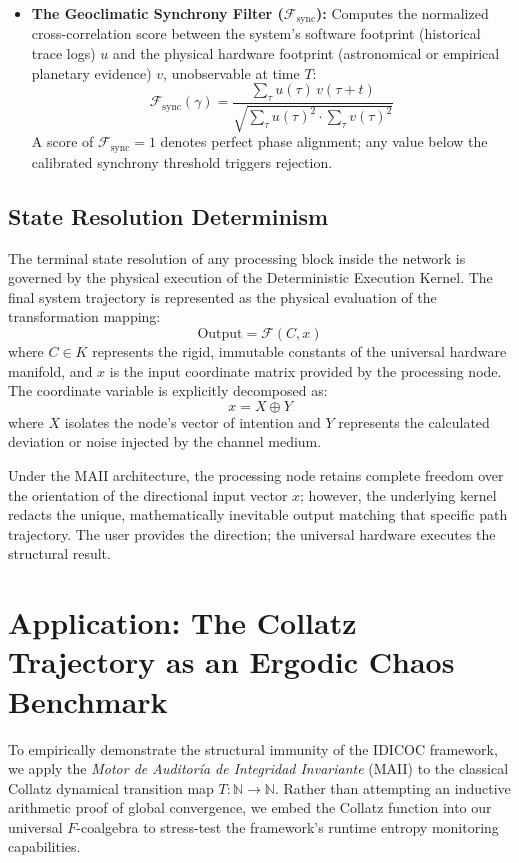 \documentclass[11pt,a4paper]{article}
\begin{document}
\begin{itemize}
\begin{equation}
    \end{equation}
    where $H$ denotes the Shannon informational entropy of the sequence.
    \item \textbf{The Geoclimatic Synchrony Filter ($\mathcal{F}_{\text{sync}}$):} Computes the normalized cross-correlation score between the system's software footprint (historical trace logs) $u$ and the physical hardware footprint (astronomical or empirical planetary evidence) $v$, unobservable at time $T$:
    \begin{equation}
        \mathcal{F}_{\text{sync}}(\gamma) = \frac{\sum_{\tau} u(\tau)\, v(\tau + t)}{\sqrt{\sum_{\tau} u(\tau)^2 \cdot \sum_{\tau} v(\tau)^2}}
    \end{equation}
    A score of $\mathcal{F}_{\text{sync}} = 1$ denotes perfect phase alignment; any value below the calibrated synchrony threshold triggers rejection.
\end{itemize}

\subsection{State Resolution Determinism}
The terminal state resolution of any processing block inside the network is governed by the physical execution of the Deterministic Execution Kernel. The final system trajectory is represented as the physical evaluation of the transformation mapping:
\begin{equation}
    \text{Output} = \mathcal{F}(C, x)
\end{equation}
where $C \in K$ represents the rigid, immutable constants of the universal hardware manifold, and $x$ is the input coordinate matrix provided by the processing node. The coordinate variable is explicitly decomposed as:
\begin{equation}
    x = X \oplus Y
\end{equation}
where $X$ isolates the node's vector of intention and $Y$ represents the calculated deviation or noise injected by the channel medium. 

Under the MAII architecture, the processing node retains complete freedom over the orientation of the directional input vector $x$; however, the underlying kernel redacts the unique, mathematically inevitable output matching that specific path trajectory. The user provides the direction; the universal hardware executes the structural result.

\section{Application: The Collatz Trajectory as an Ergodic Chaos Benchmark}
To empirically demonstrate the structural immunity of the IDICOC framework, we apply the \textit{Motor de Auditoría de Integridad Invariante} (MAII) to the classical Collatz dynamical transition map $T: \mathbb{N} \to \mathbb{N}$. Rather than attempting an inductive arithmetic proof of global convergence, we embed the Collatz function into our universal $F$-coalgebra to stress-test the framework's runtime entropy monitoring capabilities.
\end{document}
